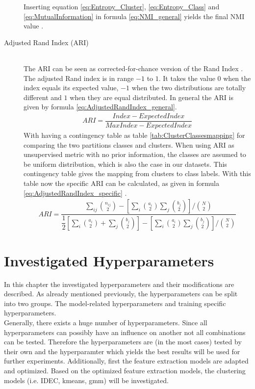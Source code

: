 \documentclass[12pt,DIV14,BCOR12mm,a4paper,footexclude,headinclude,halfparskip-,twoside,openright,openany,cleardoubleempty,idxtotoc,bibtotoc]{scrreprt} %
\numberwithin{equation}{chapter}
\begin{document}
\begin{description}
	Inserting equation \ref{eq:Entropy_Cluster}, \ref{eq:Entropy_Class} and \ref{eq:MutualInformation} in formula \ref{eq:NMI_general} yields the final NMI value \cite{Vinh10NMI}.
	\item[Adjusted Rand Index (ARI)]\hfill \\
	The ARI can be seen as corrected-for-chance version of the Rand Index \cite{Rand71RandIndex}. The adjusted Rand index is in range $-1$ to $1$. It takes the value $0$ when the index equals its expected value, $-1$ when the two distributions are totally different and $1$ when they are equal distributed. In general the ARI is given by formula \ref{eq:AdjustedRandIndex_general}.
	\begin{align}
		ARI = \dfrac{Index - ExpectedIndex}{MaxIndex - ExpectedIndex}\label{eq:AdjustedRandIndex_general}
	\end{align}
	With having a contingency table as table \ref{tab:ClusterClassesmapping} for comparing the two partitions classes and clusters. When using ARI as unsupervised metric with no prior information, the classes are assumed to be uniform distribution, which is also the case in our datasets. This contingency table gives the mapping from clusters to class labels. With this table now the specific ARI can be calculated, as given in formula \ref{eq:AdjustedRandIndex_specific} \cite{Yeung01ARI}.
	\begin{align}
		ARI = \dfrac{\sum_{ij}\binom{n_{ij}}{2}-[\sum_i\binom{a_i}{2}\sum_j\binom{b_j}{2}]/\binom{N}{2}}{\dfrac{1}{2}[\sum_i\binom{a_i}{2}+\sum_j\binom{b_j}{2}]-[\sum_i\binom{a_i}{2}\sum_j\binom{b_j}{2}]/\binom{N}{2}}\label{eq:AdjustedRandIndex_specific}
	\end{align}
\end{description} 
\section{Investigated Hyperparameters}
In this chapter the investigated hyperparameters and their modifications are described. As already mentioned previously, the hyperparameters can be split into two groups. The model-related hyperparameters and training specific hyperparameters.\\
Generally, there exists a huge number of hyperparameters. Since all hyperparameters can possibly have an influence on another not all combinations can be tested. Therefore the hyperparameters are (in the most cases) tested by their own and the hyperparamter which yields the best results will be used for further experiments. Additionally, first the feature extraction models are adapted and optimized. Based on the optimized feature extraction models, the clustering models (i.e. IDEC, kmeans, gmm) will be investigated.
\end{document}
